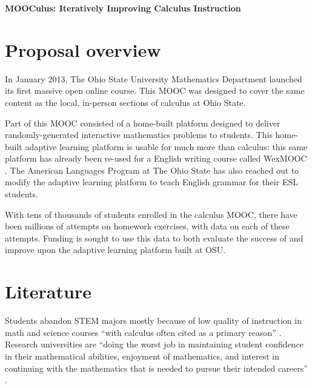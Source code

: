 \documentclass[12pt]{article}
\begin{document}
\begin{center}
  \textbf{MOOCulus: Iteratively Improving Calculus Instruction}
\end{center}

% 

\section{Proposal overview}

In January 2013, The Ohio State University Mathematics Department
launched its first massive open online course.  This MOOC was designed
to cover the same content as the local, in-person sections of calculus
at Ohio State.

Part of this MOOC consisted of a home-built platform designed to
deliver randomly-generated interactive mathematics problems to
students.  This home-built adaptive learning platform is usable for
much more than calculus: this same platform has already been re-used
for a English writing course called
WexMOOC \parencite{gates-foundation-grant}.  The American Languages
Program at The Ohio State has also reached out to modify the adaptive
learning platform to teach English grammar for their ESL students.

With tens of thousands of students enrolled in the calculus MOOC,
there have been millions of attempts on homework exercises, with data
on each of these attempts.  Funding is sought to use this data to both
evaluate the success of and improve upon the adaptive learning
platform built at OSU.

\section{Literature}

Students abandon STEM majors mostly because of low quality of
instruction in math and science courses ``with calculus often cited as
a primary reason'' \parencite{calculus-programs}.  Research
universities are ``doing the worst job in maintaining student
confidence in their mathematical abilities, enjoyment of mathematics,
and interest in continuing with the mathematics that is needed to
pursue their intended careers'' \cite{calculus-students}.
\end{document}
